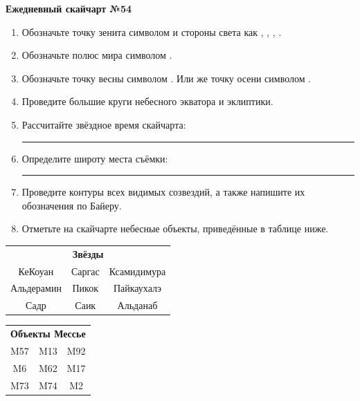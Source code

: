 \documentclass{./SAS-class-skygen}
\begin{document}
    
    
    
	\begin{center}
		\large\textbf{Ежедневный скайчарт №54}
	\end{center}

	\begin{enumerate}
		\item Обозначьте точку зенита символом  и стороны света как , , , .
		\item Обозначьте полюс мира символом .
		\item Обозначьте точку весны символом \Aries. Или же точку осени символом \Libra.
		\item Проведите большие круги небесного экватора и эклиптики.
		\item Рассчитайте звёздное время скайчарта: \rule{2cm}{0.4pt}
		\item Определите широту места съёмки: \rule{2cm}{0.4pt}
		\item Проведите контуры всех видимых созвездий, а также напишите их обозначения по Байеру.
		\item Отметьте на скайчарте небесные объекты, приведённые в таблице ниже.
	\end{enumerate}
	
    \vspace{0.5cm}

    \begin{table}[h!]
    \centering
    \begin{tabular}{ccc}
    \multicolumn{3}{c}{\textbf{Звёзды}} \\ КеКоуан & Саргас & Ксамидимура \\
Альдерамин & Пикок & Пайкаухалэ \\
Садр & Саик & Альданаб \\

\end{tabular}
    \hfill
    \begin{tabular}{ccc}
    \multicolumn{3}{c}{\textbf{Объекты Мессье}} \\ M57 & M13 & M92 \\
M6 & M62 & M17 \\
M73 & M74 & M2 \\

\end{tabular}
    \end{table}
	
\end{document}
